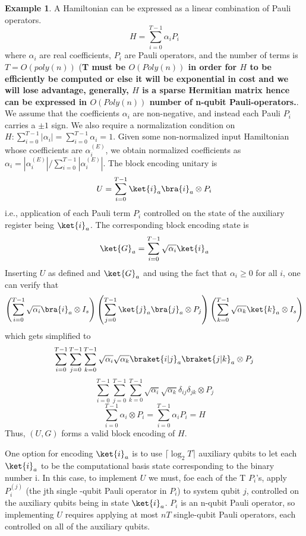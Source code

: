 \documentclass[12pt, oneside]{book}
\theoremstyle{definition}
\theoremstyle{definition}
\newtheorem{example}{Example}[section]
\theoremstyle{remark}
\begin{document}
    \begin{example}
        A Hamiltonian can be expressed as a linear combination of Pauli operators.
        \[
        H=\sum_{i=0}^{T-1} \alpha_iP_i
        \]
        where $\alpha_i$ are real coefficients, $P_i$ are Pauli operators, and the number of terms is $T=O(poly(n))$ (\textbf{T must be $O(Poly(n))$ in order for $H$ to be efficiently be computed or else it will be exponential in cost and we will lose advantage, generally, $H$ is a sparse Hermitian matrix hence can be expressed in $O(Poly(n))$ number of n-qubit Pauli-operators.}. We assume that the coefficients $\alpha_i$ are non-negative, and instead each Pauli $P_i$ carries a $\pm 1$ sign. We also require a normalization condition on $H: \sum_{i=0}^{T-1}|\alpha_i|=\sum_{i=0}^{T-1}\alpha_i=1$. Given some non-normalized input Hamiltonian whose coefficients are $\alpha_i^{(E)}$, we obtain normalized coefficients as $\alpha_i=|\alpha_i^{(E)}|/\sum_{i=0}^{T-1}|\alpha_i^{(E)}|$.
        The block encoding unitary is
        \[
        U=\sum_{i=0}^{T-1} \ket{i}_a\bra{i}_a\otimes P_i
        \]
        i.e., application of each Pauli term $P_i$ controlled on the state of the auxiliary register being $\ket{i}_a$. The corresponding block encoding state is
        \[
        \ket{G}_a=\sum_{i=0}^{T-1}\sqrt{\alpha_i}\ket{i}_a
        \]
        Inserting $U$ as defined and $\ket{G}_a$ and using the fact that $\alpha_i\geq 0$ for all $i$, one can verify that
        \[
        \left(\sum_{i=0}^{T-1} \sqrt{\alpha_i}\bra{i}_a \otimes I_s\right)\left(\sum_{j=0}^{T-1}\ket{j}_a \bra{j}_a\otimes P_j\right)\left(\sum_{k=0}^{T-1} \sqrt{\alpha_k}\ket{k}_a \otimes I_s\right)
        \]
        which gets simplified to
        \[
        \sum_{i=0}^{T-1}\sum_{j=0}^{T-1}\sum_{k=0}^{T-1}  \sqrt{\alpha_i}\sqrt{\alpha_k} \braket{i|j}_a\braket{j|k}_a \otimes P_j
        \]
        \[
        \sum_{i=0}^{T-1}\sum_{j=0}^{T-1}\sum_{k=0}^{T-1}  \sqrt{\alpha_i}\sqrt{\alpha_k} \delta_{ij}\delta_{jk} \otimes P_j
        \]
        \[
        \sum_{i=0}^{T-1} \alpha_i \otimes P_i = \sum_{i=0}^{T-1} \alpha_iP_i =  H
        \]
        Thus, $(U,G)$ forms a valid block encoding of $H$.

        One option for encoding $\ket{i}_a$ is to use $\lceil\log_2T\rceil$ auxiliary qubits to let each $\ket{i}_a$ to be the computational basis state corresponding to the binary number i. In this case, to implement $U$ we must, foe each of the T $P_i$'s, apply $P_i^{(j)}$ (the jth single -qubit Pauli operator in $P_i$) to system qubit $j$, controlled on the auxiliary qubits being in state $\ket{i}_a$. $P_i$ is an n-qubit Pauli operator, so implementing $U$ requires applying at most $nT$ single-qubit Pauli operators, each controlled on all of the auxiliary qubits.


\end{example}
\end{document}
